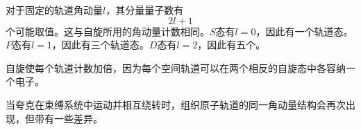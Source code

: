 对于固定的轨道角动量\(l\)，其分量量子数有
\begin{equation}
2l+1
\end{equation}
个可能取值。这与自旋所用的角动量计数相同。\(S\)态有\(l=0\)，因此有一个轨道态。\(P\)态有\(l=1\)，因此有三个轨道态。\(D\)态有\(l=2\)，因此有五个。

自旋使每个轨道计数加倍，因为每个空间轨道可以在两个相反的自旋态中各容纳一个电子。

\begin{classroomqa}
\end{classroomqa}

当夸克在束缚系统中运动并相互绕转时，组织原子轨道的同一角动量结构会再次出现，但带有一些差异。
